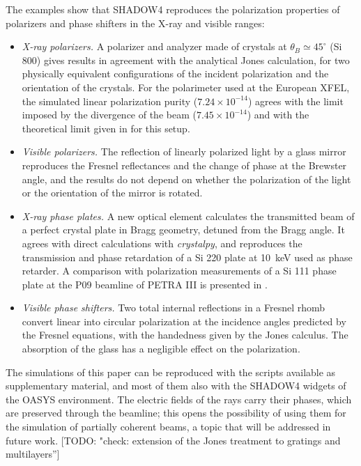 \documentclass{iucr}
\newcommand{\todo}[1]{{\color{red}[TODO: "#1'']}}
\begin{document}
The examples show that SHADOW4 reproduces the polarization properties of polarizers and phase shifters in the X-ray and visible ranges:
\begin{itemize}
\item {\it X-ray polarizers.} A polarizer and analyzer made of crystals at $\theta_B\simeq45^\circ$ (Si 800) gives results in agreement with the analytical Jones calculation, for two physically equivalent configurations of the incident polarization and the orientation of the crystals. For the polarimeter used at the European XFEL, the simulated linear polarization purity ($7.24\times10^{-14}$) agrees with the limit imposed by the divergence of the beam ($7.45\times10^{-14}$) and with the theoretical limit given in \cite{Schulze2022} for this setup.
\item {\it Visible polarizers.} The reflection of linearly polarized light by a glass mirror reproduces the Fresnel reflectances and the change of phase at the Brewster angle, and the results do not depend on whether the polarization of the light or the orientation of the mirror is rotated.
\item {\it X-ray phase plates.} A new optical element calculates the transmitted beam of a perfect crystal plate in Bragg geometry, detuned from the Bragg angle. It agrees with direct calculations with {\it crystalpy}, and reproduces the transmission and phase retardation of a Si 220 plate at 10~keV used as phase retarder. A comparison with polarization measurements of a Si 111 phase plate at the P09 beamline of PETRA III is presented in \cite{SanchezdelRio2026desy}.
\item {\it Visible phase shifters.} Two total internal reflections in a Fresnel rhomb convert linear into circular polarization at the incidence angles predicted by the Fresnel equations, with the handedness given by the Jones calculus. The absorption of the glass has a negligible effect on the polarization.
\end{itemize}

The simulations of this paper can be reproduced with the scripts available as supplementary material, and most of them also with the SHADOW4 widgets of the OASYS environment. The electric fields of the rays carry their phases, which are preserved through the beamline; this opens the possibility of using them for the simulation of partially coherent beams, a topic that will be addressed in future work. \todo{check: extension of the Jones treatment to gratings and multilayers}


\end{document}
